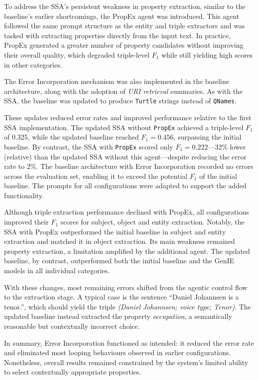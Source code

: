 \documentclass[a4paper,oneside,bibliography=totoc]{scrbook}
\begin{document}
To address the \ac{SSA}’s persistent weakness in property extraction, similar to the baseline’s earlier shortcomings, the \ac{PropEx} agent was introduced. This agent followed the same prompt structure as the entity and triple extractors and was tasked with extracting properties directly from the input text. In practice, \ac{PropEx} generated a greater number of property candidates without improving their overall quality, which degraded triple-level $F_{1}$ while still yielding high scores in other categories.

The Error Incorporation mechanism was also implemented in the baseline architecture, along with the adoption of \textit{URI retrieval} summaries. As with the \ac{SSA}, the baseline was updated to produce \texttt{Turtle} strings instead of \texttt{QNames}.

These updates reduced error rates and improved performance relative to the first \ac{SSA} implementation. The updated \ac{SSA} without \texttt{PropEx} achieved a triple-level $F_{1}$ of 0.325, while the updated baseline reached $F_{1}=0.456$, surpassing the initial baseline. By contrast, the \ac{SSA} with \texttt{PropEx} scored only $F_{1}=0.222$—32\% lower (relative) than the updated \ac{SSA} without this agent—despite reducing the error rate to 2\%. The baseline architecture with Error Incorporation recorded no errors across the evaluation set, enabling it to exceed the potential $F_{1}$ of the initial baseline. The prompts for all configurations were adapted to support the added functionality.

Although triple extraction performance declined with \ac{PropEx}, all configurations improved their $F_{1}$ scores for subject, object and entity extraction. Notably, the \ac{SSA} with \ac{PropEx} outperformed the initial baseline in subject and entity extraction and matched it in object extraction. Its main weakness remained property extraction, a limitation amplified by the additional agent. The updated baseline, by contrast, outperformed both the initial baseline and the GenIE models in all individual categories.

With these changes, most remaining errors shifted from the agentic control flow to the extraction stage. A typical case is the sentence \enquote{Daniel Johannsen is a tenor.}, which should yield the triple \textit{(Daniel Johannsen; voice type; Tenor)}. The updated baseline instead extracted the property \textit{occupation}, a semantically reasonable but contextually incorrect choice.

In summary, Error Incorporation functioned as intended: it reduced the error rate and eliminated most looping behaviours observed in earlier configurations. Nonetheless, overall results remained constrained by the system’s limited ability to select contextually appropriate properties.
\end{document}
